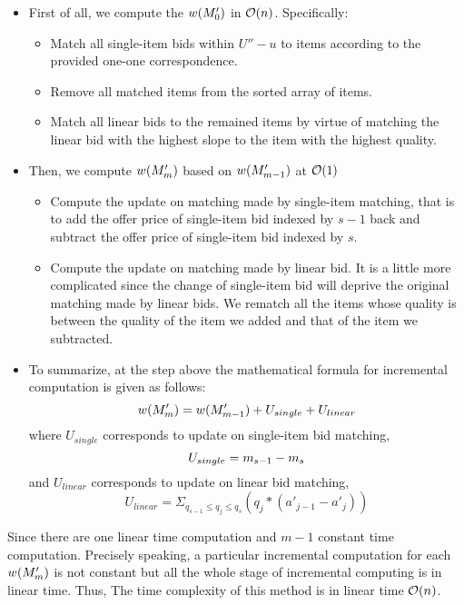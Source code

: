 \documentclass[11pt,a4paper]{article}
\begin{document}
\begin{itemize}
    \item{First of all, we compute the $w(M'_{0})$ in $\mathcal{O}(n)$.
        Specifically: }
        \begin{itemize}
            \item{Match all single-item bids within $U''-u$ to items according to
                the provided one-one correspondence.}
            \item{Remove all matched items from the sorted array of items.}
            \item{Match all linear bids to the remained items by virtue of
                    matching the linear bid with the highest slope to the item
                with the highest quality.}
        \end{itemize}
    \item{Then, we compute $w(M'_{m})$ based on $w(M'_{m-1})$ at $\mathcal{O}(1)$}
        \begin{itemize}
        \item{Compute the update on matching made by single-item matching,
                that is to add the offer price of single-item bid indexed by
                $s-1$ back and subtract the offer price of single-item bid
            indexed by $s$.}
        \item{Compute the update on matching made by linear bid. It is a
            little more complicated since the change of single-item bid will
        deprive the original matching made by linear bids. We rematch all the
        items whose quality is between the quality of the item we added
        and that of the item we subtracted.} 
    \end{itemize}
    \item{To summarize, at the step above the mathematical formula for
        incremental computation is given as follows: } $$ 
    w(M'_{m}) = w(M'_{m-1}) + U_{single} + U_{linear}
    $$ 
    where $U_{single}$ corresponds to update on single-item bid matching,
    $$ 
    U_{single} = m_{s-1} - m_{s}
    $$ 
    and $U_{linear}$ corresponds to update on linear bid matching,
    $$ 
    U_{linear} = \Sigma_{q_{s-1} \leq q_j \leq q_{s}} (q_j * (a'_{j-1} - a'_j)) 
    $$ 
\end{itemize}
 
Since there are one linear time computation and $m-1$ constant time
computation. Precisely speaking, a particular incremental computation for each
$w(M'_{m})$ is not constant but all the whole stage of incremental computing is
in linear time. Thus, The time complexity of this method is in linear time
$\mathcal{O}(n)$.

\end{document}
